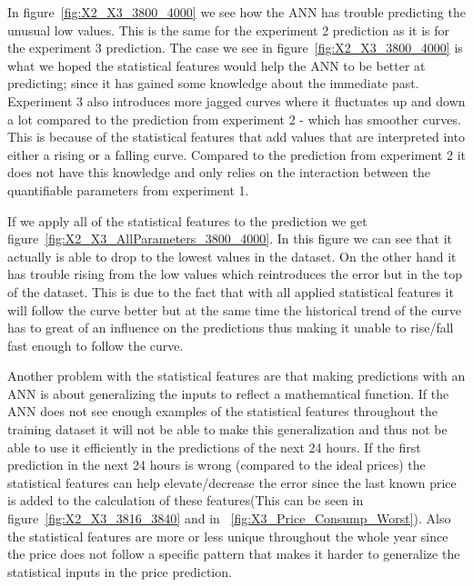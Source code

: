 In figure~\ref{fig:X2_X3_3800_4000} we see how the ANN has trouble predicting the unusual low values. This is the same for the experiment 2 prediction as it is for the experiment 3 prediction. The case we see in figure~\ref{fig:X2_X3_3800_4000} is what we hoped the statistical features would help the ANN to be better at predicting; since it has gained some knowledge about the immediate past. Experiment 3 also introduces more jagged curves where it fluctuates up and down a lot compared to the prediction from experiment 2 - which has smoother curves. This is because of the statistical features that add values that are interpreted into either a rising or a falling curve. Compared to the prediction from experiment 2 it does not have this knowledge and only relies on the interaction between the quantifiable parameters from experiment 1.

If we apply all of the statistical features to the prediction we get figure~\ref{fig:X2_X3_AllParameters_3800_4000}. In this figure we can see that it actually is able to drop to the lowest values in the dataset. On the other hand it has trouble rising from the low values which reintroduces the error but in the top of the dataset. This is due to the fact that with all applied statistical features it will follow the curve better but at the same time the historical trend of the curve has to great of an influence on the predictions thus making it unable to rise/fall fast enough to follow the curve.

Another problem with the statistical features are that making predictions with an ANN is about generalizing the inputs to reflect a mathematical function. If the ANN does not see enough examples of the statistical features throughout the training dataset it will not be able to make this generalization and thus not be able to use it efficiently in the predictions of the next 24 hours. If the first prediction in the next 24 hours is wrong (compared to the ideal prices) the statistical features can help elevate/decrease the error since the last known price is added to the calculation of these features(This can be seen in figure~\ref{fig:X2_X3_3816_3840} and in ~\ref{fig:X3_Price_Consump_Worst}). Also the statistical features are more or less unique throughout the whole year since the price does not follow a specific pattern that makes it harder to generalize the statistical inputs in the price prediction. 


